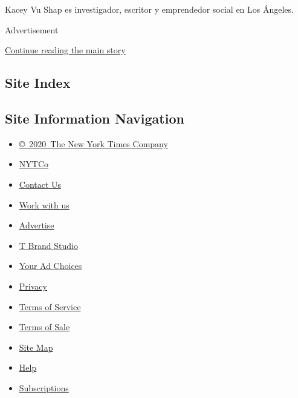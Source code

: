 Kacey Vu Shap es investigador, escritor y emprendedor social en Los
Ángeles.

Advertisement

\protect\hyperlink{after-bottom}{Continue reading the main story}

\hypertarget{site-index}{%
\subsection{Site Index}\label{site-index}}

\hypertarget{site-information-navigation}{%
\subsection{Site Information
Navigation}\label{site-information-navigation}}

\begin{itemize}
\tightlist
\item
  \href{https://help.nytimes3xbfgragh.onion/hc/en-us/articles/115014792127-Copyright-notice}{©~2020~The
  New York Times Company}
\end{itemize}

\begin{itemize}
\tightlist
\item
  \href{https://www.nytco.com/}{NYTCo}
\item
  \href{https://help.nytimes3xbfgragh.onion/hc/en-us/articles/115015385887-Contact-Us}{Contact
  Us}
\item
  \href{https://www.nytco.com/careers/}{Work with us}
\item
  \href{https://nytmediakit.com/}{Advertise}
\item
  \href{http://www.tbrandstudio.com/}{T Brand Studio}
\item
  \href{https://www.nytimes3xbfgragh.onion/privacy/cookie-policy\#how-do-i-manage-trackers}{Your
  Ad Choices}
\item
  \href{https://www.nytimes3xbfgragh.onion/privacy}{Privacy}
\item
  \href{https://help.nytimes3xbfgragh.onion/hc/en-us/articles/115014893428-Terms-of-service}{Terms
  of Service}
\item
  \href{https://help.nytimes3xbfgragh.onion/hc/en-us/articles/115014893968-Terms-of-sale}{Terms
  of Sale}
\item
  \href{https://spiderbites.nytimes3xbfgragh.onion}{Site Map}
\item
  \href{https://help.nytimes3xbfgragh.onion/hc/en-us}{Help}
\item
  \href{https://www.nytimes3xbfgragh.onion/subscription?campaignId=37WXW}{Subscriptions}
\end{itemize}
